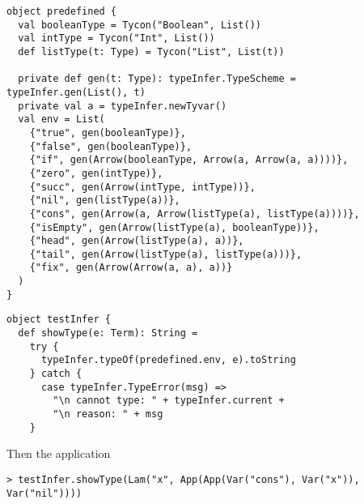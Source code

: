 \begin{lstlisting}
object predefined {
  val booleanType = Tycon("Boolean", List())
  val intType = Tycon("Int", List())
  def listType(t: Type) = Tycon("List", List(t))

  private def gen(t: Type): typeInfer.TypeScheme = typeInfer.gen(List(), t)
  private val a = typeInfer.newTyvar()
  val env = List(
    {"true", gen(booleanType)},
    {"false", gen(booleanType)},
    {"if", gen(Arrow(booleanType, Arrow(a, Arrow(a, a))))},
    {"zero", gen(intType)},
    {"succ", gen(Arrow(intType, intType))},
    {"nil", gen(listType(a))},
    {"cons", gen(Arrow(a, Arrow(listType(a), listType(a))))},
    {"isEmpty", gen(Arrow(listType(a), booleanType))},
    {"head", gen(Arrow(listType(a), a))},
    {"tail", gen(Arrow(listType(a), listType(a)))},
    {"fix", gen(Arrow(Arrow(a, a), a))}
  )
}
\end{lstlisting}
\begin{lstlisting}
object testInfer {
  def showType(e: Term): String =
    try {
      typeInfer.typeOf(predefined.env, e).toString
    } catch {
      case typeInfer.TypeError(msg) => 
        "\n cannot type: " + typeInfer.current +
        "\n reason: " + msg
    }
\end{lstlisting}
Then the application
\begin{lstlisting}
> testInfer.showType(Lam("x", App(App(Var("cons"), Var("x")), Var("nil"))))
\end{lstlisting}
